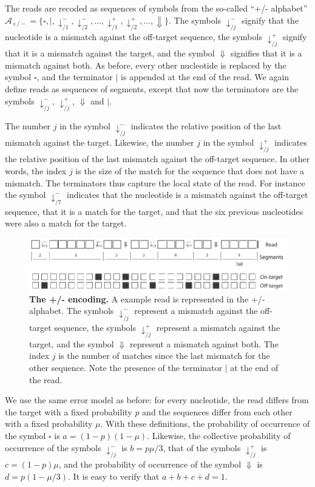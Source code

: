 \documentclass{article}
\begin{document}
The reads are recoded as sequences of symbols from the so-called ``+/-
alphabet'' $\mathcal{A}_{+/-} = \{\square, |, \downarrow_{/1}^-,
\downarrow_{/2}^-, \ldots, \downarrow_{/1}^+, \downarrow_{/2}^+, \ldots,
\Downarrow\}$. The symbols $\downarrow_{/j}^-$ signify that the nucleotide
is a mismatch against the off-target sequence, the symbols
$\downarrow_{/j}^+$ signify that it is a mismatch against the target, and
the symbol $\Downarrow$ signifies that it is a mismatch against both. As
before, every other nucleotide is replaced by the symbol $\square$, and
the terminator $|$ is appended at the end of the read. We again define
reads as sequences of segments, except that now the terminators are the
symbols $\downarrow_{/j}^-$, $\downarrow_{/j}^+$, $\Downarrow$ and $|$.

The number $j$ in the symbol $\downarrow_{/j}^-$ indicates the relative
position of the last mismatch against the target. Likewise, the number $j$
in the symbol $\downarrow_{/j}^+$ indicates the relative position of the
last mismatch against the off-target sequence. In other words, the index
$j$ is the size of the match for the sequence that does not have a
mismatch. The terminators thus capture the local state of the read. For
instance the symbol $\downarrow_{/7}^-$ indicates that the nucleotide is a
mismatch against the off-target sequence, that it is a match for the
target, and that the six previous nucleotides were also a match for the
target.

\begin{figure}[h]
\centering
\includegraphics[scale=0.88]{sketch_dual.pdf}
\caption{\textbf{The +/- encoding.}
A example read is represented in the +/- alphabet. The symbols
$\downarrow_{/j}^-$ represent a mismatch against the off-target sequence,
the symbols $\downarrow_{/j}^+$ represent a mismatch against the target,
and the symbol $\Downarrow$ represent a mismatch against both. The index
$j$ is the number of matches since the last mismatch for the other
sequence. Note the presence of the terminator $|$ at the end of the read.
}
\label{fig:dual}
\end{figure}

We use the same error model as before: for every nucleotide, the read
differs from the target with a fixed probability $p$ and the sequences
differ from each other with a fixed probability $\mu$. With these
definitions, the probability of occurrence of the symbol $\square$ is $a =
(1-p)(1-\mu)$. Likewise, the collective probability of occurrence of the
symbols $\downarrow_{/j}^-$ is $b = p\mu/3$, that of the symbols 
$\downarrow_{/j}^+$ is $c = (1-p)\mu$, and the probability of occurrence
of the symbol $\Downarrow$ is $d = p(1-\mu/3)$. It is easy to verify that
$a+b+c+d=1$.
\end{document}
